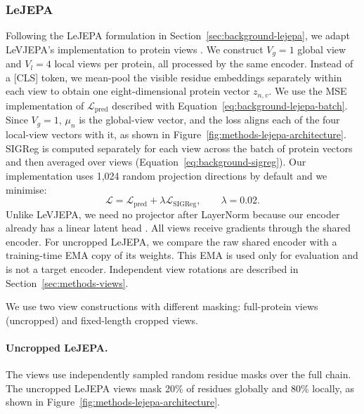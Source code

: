\subsubsection{LeJEPA}

Following the LeJEPA formulation in Section~\ref{sec:background-lejepa}, we adapt LeVJEPA's implementation to protein views \citep{kuhn2026levjepaefficientscalable}. We construct $V_g=1$ global view and $V_l=4$ local views per protein, all processed by the same encoder. Instead of a [CLS] token, we mean-pool the visible residue embeddings separately within each view to obtain one eight-dimensional protein vector $z_{n,v}$. We use the MSE implementation of $\mathcal{L}_{\mathrm{pred}}$ described with Equation~\ref{eq:background-lejepa-batch}. Since $V_g=1$, $\mu_n$ is the global-view vector, and the loss aligns each of the four local-view vectors with it, as shown in Figure~\ref{fig:methods-lejepa-architecture}. SIGReg is computed separately for each view across the batch of protein vectors and then averaged over views (Equation~\ref{eq:background-sigreg}). Our implementation uses 1,024 random projection directions by default and we minimise:
\begin{equation}
    \mathcal{L}=\mathcal{L}_{\mathrm{pred}}+\lambda\mathcal{L}_{\mathrm{SIGReg}},
    \qquad \lambda=0.02.
    \label{eq:methods-lejepa-loss}
\end{equation}
Unlike LeVJEPA, we need no projector after LayerNorm because our encoder already has a linear latent head \citep{kuhn2026levjepaefficientscalable}. All views receive gradients through the shared encoder. For uncropped LeJEPA, we compare the raw shared encoder with a training-time EMA copy of its weights. This EMA is used only for evaluation and is not a target encoder. Independent view rotations are described in Section~\ref{sec:methods-views}.

We use two view constructions with different masking: full-protein views (uncropped) and fixed-length cropped views.

\paragraph{Uncropped LeJEPA.}\nopagebreak[4] The views use independently sampled random residue masks over the full chain. The uncropped LeJEPA views mask 20\% of residues globally and 80\% locally, as shown in Figure~\ref{fig:methods-lejepa-architecture}.

